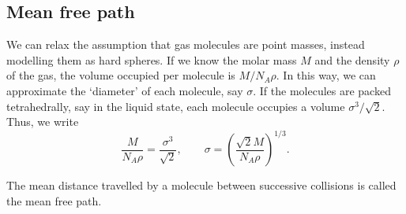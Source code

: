 \documentclass[11pt]{article}
\theoremstyle{definition}
\theoremstyle{remark}
\numberwithin{equation}{section}
\begin{document}
    \subsection{Mean free path}
    We can relax the assumption that gas molecules are point masses, instead
    modelling them as hard spheres. If we know the molar mass $M$ and the density
    $\rho$ of the gas, the volume occupied per molecule is $M / N_A\rho$.
    In this way, we can approximate the `diameter' of each molecule, say $\sigma$.
    If the molecules are packed tetrahedrally, say in the liquid state, each
    molecule occupies a volume $\sigma^3 / \sqrt{2}$. Thus, we write \[
        \frac{M}{N_A \rho} = \frac{\sigma^3}{\sqrt{2}}, \qquad
        \sigma = \left(\frac{\sqrt{2} M}{ N_A \rho}\right)^{1 /3}.
    \]

    \begin{definition}
        The mean distance travelled by a molecule between successive collisions is
        called the mean free path.
    \end{definition}
\end{document}
